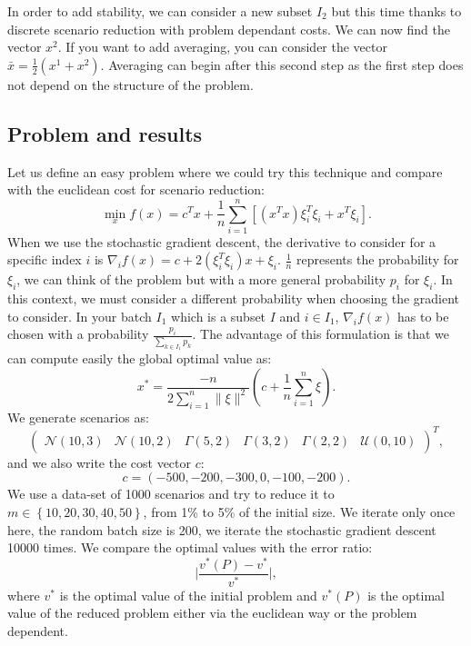 \documentclass{amsart}
\begin{document}
In order to add stability, we can consider a new subset $I_2$ but this time thanks to discrete scenario reduction with problem dependant costs. We can now find the vector $x^2$. If you want to add averaging, you can consider the vector $\bar{x}=\frac{1}{2}\left(x^1+x^2\right)$. Averaging can begin after this second step as the first step does not depend on the structure of the problem. 
\subsection{Problem and results}
Let us define an easy problem where we could try this technique and compare with the euclidean cost for scenario reduction:
$$
    \min_{x}f\left(x\right)=c^Tx +\frac{1}{n}\sum_{i=1}^n \left[\left(x^Tx\right)\xi_i^T\xi_i+x^T\xi_i\right].
$$
When we use the stochastic gradient descent, the derivative to consider for a specific index $i$ is $\nabla_i f\left(x\right)= c+2\left(\xi_i^T\xi_i\right)x+\xi_i$. $\frac{1}{n}$ represents the probability for $\xi_i$, we can think of the problem but with a more general probability $p_i$ for $\xi_i$. In this context, we must consider a different probability when choosing the gradient to consider. In your batch $I_1$ which is a subset $I$ and $i\in I_1$, $\nabla_if\left(x\right)$ has to be chosen with a probability $\frac{p_i}{\sum_{k\in I_1}p_k}$. The advantage of this formulation is that we can compute easily the global optimal value as:
$$    
x^*=\frac{-n}{2\sum_{i=1}^n\lVert\xi\rVert^2}\left(c + \frac{1}{n}\sum_{i=1}^n\xi\right).
$$
We generate scenarios as:
$$
\begin{pmatrix}
    \mathcal{N}\left(10,3\right) & \mathcal{N}\left(10,2\right) & \Gamma\left(5,2\right) & \Gamma\left(3,2\right) &\Gamma\left(2,2\right) & \mathcal{U}\left(0,10\right)
\end{pmatrix}^T,
$$
and we also write the cost vector $c$:
$$
c=\left(-500,-200,-300,0,-100,-200\right).
$$
We use a data-set of 1000 scenarios and try to reduce it to $m\in\left\{10,20,30,40,50\right\}$, from 1\% to 5\% of the initial size. We iterate only once here, the random batch size is 200, we iterate the stochastic gradient descent 10000 times. We compare the optimal values with the error ratio:
$$
\lvert\frac{ v^*\left(P\right)-v^*}{v^*}\rvert,
$$
where $v^*$ is the optimal value of the initial problem and $v^*\left(P\right)$ is the optimal value of the reduced problem either via the euclidean way or the problem dependent. 
\clearpage
\end{document}
